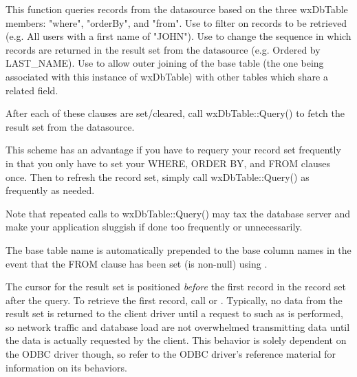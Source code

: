 

This function queries records from the datasource based on the three  
wxDbTable members: "where", "orderBy", and "from".  Use 
 to filter on 
records to be retrieved (e.g. All users with a first name of "JOHN").  
Use  to 
change the sequence in which records are returned in the result set from 
the datasource (e.g. Ordered by LAST_NAME).  Use 
 to allow outer 
joining of the base table (the one being associated with this instance of 
wxDbTable) with other tables which share a related field.  

After each of these clauses are set/cleared, call wxDbTable::Query() to 
fetch the result set from the datasource.  

This scheme has an advantage if you have to requery your record set 
frequently in that you only have to set your WHERE, ORDER BY, and FROM 
clauses once.  Then to refresh the record set, simply call wxDbTable::Query() 
as frequently as needed.  

Note that repeated calls to wxDbTable::Query() may tax the database 
server and make your application sluggish if done too frequently or 
unnecessarily.  

The base table name is automatically prepended to the base column names in 
the event that the FROM clause has been set (is non-null) using 
.

The cursor for the result set is positioned {\it before} the first record in 
the record set after the query.  To retrieve the first record, call 
 or 
.  Typically, no data from the 
result set is returned to the client driver until a request to such as 
 is performed, so network 
traffic and database load are not overwhelmed transmitting data until the 
data is actually requested by the client.  This behavior is solely dependent 
on the ODBC driver though, so refer to the ODBC driver's reference material 
for information on its behaviors.

